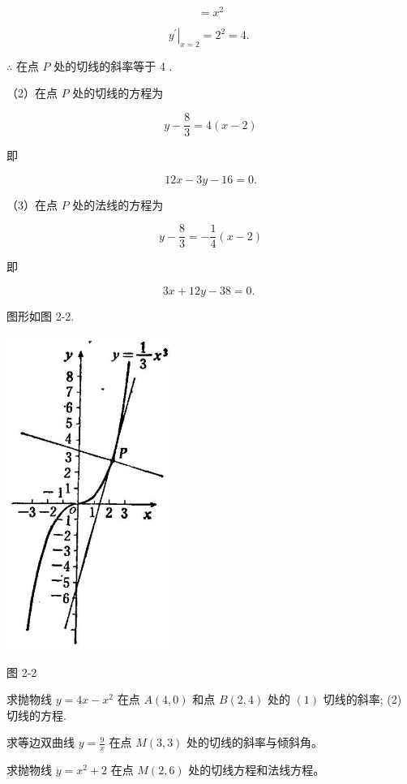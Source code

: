 \documentclass[lang=cn,newtx,10pt,scheme=chinese]{elegantbook}
\begin{document}
\[
= {x}^{2}
\]

\[
{\left. {y}^{\prime }\right| }_{x = 2} = {2}^{2} = 4\text{. }
\]

\(\therefore\) 在点 \(P\) 处的切线的斜率等于 4 .

（2）在点 \(P\) 处的切线的方程为

\[
y - \frac{8}{3} = 4\left( {x - 2}\right)
\]

即

\[
{12x} - {3y} - {16} = 0.
\]

（3）在点 \(P\) 处的法线的方程为

\[
y - \frac{8}{3} = - \frac{1}{4}\left( {x - 2}\right)
\]

即

\[
{3x} + {12y} - {38} = 0\text{. }
\]

图形如图 2-2.

\begin{center}
\includegraphics[max width=0.4\textwidth]{images/01912c18-5c3f-733d-b775-749ba9897a9d_65_242214.jpg}
\end{center}

图 2-2

\begin{problemset}[练习]

\item 求抛物线 \(y = {4x} - {x}^{2}\) 在点 \(A\left( {4,0}\right)\) 和点 \(B\left( {2,4}\right)\) 处的 \(\left( 1\right)\) 切线的斜率; (2) 切线的方程.

\item 求等边双曲线 \(y = \frac{9}{x}\) 在点 \(M\left( {3,3}\right)\) 处的切线的斜率与倾斜角。

\item 求抛物线 \(y = {x}^{2} + 2\) 在点 \(M\left( {2,6}\right)\) 处的切线方程和法线方程。

\end{problemset}
\end{document}
